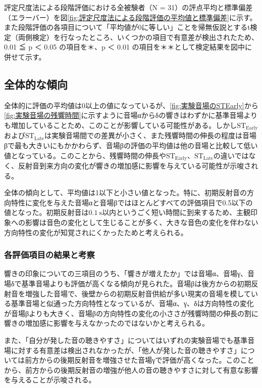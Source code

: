 \documentclass[11pt,a4j]{jreport}
\begin{document}
評定尺度法による段階評価における全被験者（N = 31）の評点平均と標準偏差（エラーバー）を図\ref{fig:評定尺度法による段階評価の平均値と標準偏差}に示す。また段階評価の各項目について「平均値が0に等しい」ことを帰無仮説とするt検定（両側検定）を行なったところ、いくつかの項目で有意差が検出されたため、0.01 ≦ p ＜ 0.05 の項目を＊、p ＜ 0.01 の項目を＊＊として検定結果を図中に併せて示す。

\subsection{全体的な傾向}

全体的に評価の平均値は0以上の値になっているが、\ref{fig:実験音場のSTEarly}から\ref{fig:実験音場の残響時間}に示すように音場αからδの響きはわずかに基準音場よりも増加していることため、このことが影響している可能性がある。しかし$\mathrm{ST_{Early}}$および$\mathrm{ST_{Late}}$は実験音場間での差異が小さく、また残響時間の伸長の程度は音場βで最も大きいにもかかわらず、音場βの評価の平均値は他の音場と比較して低い値となっている。このことから、残響時間の伸長や$\mathrm{ST_{Early}}$、$\mathrm{ST_{Late}}$の違いではなく、反射音到来方向の変化が響きの増加感に影響を与えている可能性が示唆される。

全体の傾向として、平均値は1以下と小さい値となった。特に、初期反射音の方向特性に変化を与えた音場αと音場βではほとんどすべての評価項目で0.5以下の値となった。初期反射音は$\SI{0.1}{\second}$以内というごく短い時間に到来するため、主観印象への影響は音色の変化として生じることが多く、大きな音色の変化を伴わない方向特性の変化が知覚されにくかったためと考えられる。

\subsubsection*{各評価項目の結果と考察}

響きの印象についての三項目のうち、「響きが増えたか」では音場α、音場γ、音場δで基準音場よりも評価が高くなる傾向が見られた。音場βは後方からの初期反射音を増強した音場で、後壁からの初期反射音供給が多い現実の音場を模している基準音場と似通った方向特性となっているが、音場α、γ、δは方向特性の変化が音場βよりも大きく、音場βの方向特性の変化の小ささが残響時間の伸長の割に響きの増加感に影響を与えなかったのではないかと考えられる。

また、「自分が発した音の聴きやすさ」についてはいずれの実験音場でも基準音場に対する有意差は検出されなかったが、「他人が発した音の聴きやすさ」については前方からの後期反射音を増強させた音場γで評価が高くなった。このことから、前方からの後期反射音の増強が他人の音の聴きやすさに対して有意な影響を与えることが示唆される。
\end{document}
